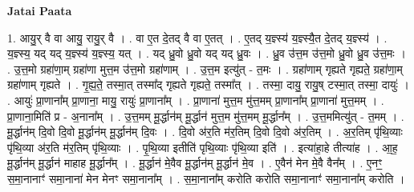 \documentclass[17pt]{extarticle}
\begin{document}
\textbf{Jatai Paata} \newline

1. आयु॒र् वै वा आयु॒ रायु॒र् वै । . वा ए॒त दे॒तद् वै वा ए॒तत् । . ए॒तद् य॒ज्ञ्स्य॑ य॒ज्ञ्स्यै॒त दे॒तद् य॒ज्ञ्स्य॑ । . य॒ज्ञ्स्य॒ यद् यद् य॒ज्ञ्स्य॑ य॒ज्ञ्स्य॒ यत् । . यद् ध्रु॒वो ध्रु॒वो यद् यद् ध्रु॒वः । . ध्रु॒व उ॑त्त॒म उ॑त्त॒मो ध्रु॒वो ध्रु॒व उ॑त्त॒मः । . उ॒त्त॒मो ग्रहा॑णा॒म् ग्रहा॑णा मुत्त॒म उ॑त्त॒मो ग्रहा॑णाम् । . उ॒त्त॒म इत्यु॑त् - त॒मः । . ग्रहा॑णाम् गृह्यते गृह्यते॒ ग्रहा॑णा॒म् ग्रहा॑णाम् गृह्यते । . गृ॒ह्य॒ते॒ तस्मा॒त् तस्मा᳚द् गृह्यते गृह्यते॒ तस्मा᳚त् । . तस्मा॒ दायु॒ रायु॒ष् टस्मा॒त् तस्मा॒ दायुः॑ । . आयुः॑ प्रा॒णाना᳚म् प्रा॒णाना॒ मायु॒ रायुः॑ प्रा॒णाना᳚म् । . प्रा॒णाना॑ मुत्त॒म मु॑त्त॒मम् प्रा॒णाना᳚म् प्रा॒णाना॑ मुत्त॒मम् । . प्रा॒णाना॒मिति॑ प्र - अ॒नाना᳚म् । . उ॒त्त॒मम् मू॒र्द्धान॑म् मू॒र्द्धान॑ मुत्त॒म मु॑त्त॒मम् मू॒र्द्धान᳚म् । . उ॒त्त॒ममित्यु॑त् - त॒मम् । . मू॒र्द्धान॑म् दि॒वो दि॒वो मू॒र्द्धान॑म् मू॒र्द्धान॑म् दि॒वः । . दि॒वो अ॑र॒ति म॑र॒तिम् दि॒वो दि॒वो अ॑र॒तिम् । . अ॒र॒तिम् पृ॑थि॒व्याः पृ॑थि॒व्या अ॑र॒ति म॑र॒तिम् पृ॑थि॒व्याः । . पृ॒थि॒व्या इतीति॑ पृथि॒व्याः पृ॑थि॒व्या इति॑ । . इत्या॑हा॒हे तीत्या॑ह । . आ॒ह॒ मू॒र्द्धान॑म् मू॒र्द्धान॑ माहाह मू॒र्द्धान᳚म् । . मू॒र्द्धान॑ मे॒वैव मू॒र्द्धान॑म् मू॒र्द्धान॑ मे॒व । . ए॒वैन॑ मेन मे॒वै वैन᳚म् । . ए॒नꣳ॒॒ स॒मा॒नानाꣳ॑ समा॒नाना॑ मेन मेनꣳ समा॒नाना᳚म् । . स॒मा॒नाना᳚म् करोति करोति समा॒नानाꣳ॑ समा॒नाना᳚म् करोति । \newline
\end{document}
